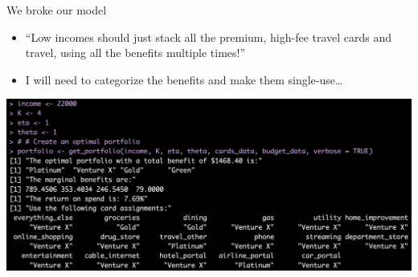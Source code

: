 \begin{frame}{We broke our model}
    \begin{itemize}
        \item<+-> ``Low incomes should just stack all the premium, high-fee travel cards and travel, using all the benefits multiple times!''
        \item<+-> I will need to categorize the benefits and make them single-use\ldots 
    \end{itemize}
    \begin{center}
        \includegraphics[width=1\textwidth]{../Misc/ModelLimit.png}
    \end{center}
\end{frame} 

